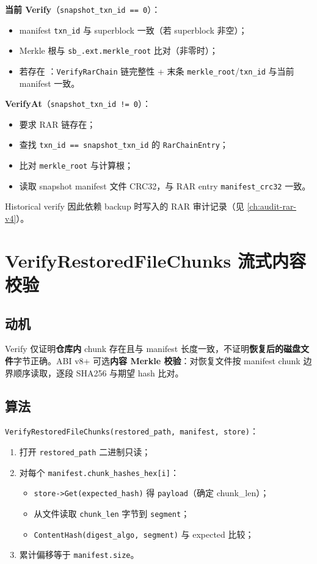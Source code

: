 \textbf{当前 Verify}（\texttt{snapshot\_txn\_id == 0}）：
\begin{itemize}[nosep]
  \item manifest \texttt{txn\_id} 与 superblock 一致（若 superblock 非空）；
  \item Merkle 根与 \texttt{sb\_.ext.merkle\_root} 比对（非零时）；
  \item 若存在 ：\texttt{VerifyRarChain} 链完整性 + 末条 \texttt{merkle\_root}/\texttt{txn\_id} 与当前 manifest 一致。
\end{itemize}

\textbf{VerifyAt}（\texttt{snapshot\_txn\_id != 0}）：
\begin{itemize}[nosep]
  \item 要求 RAR 链存在；
  \item 查找 \texttt{txn\_id == snapshot\_txn\_id} 的 \texttt{RarChainEntry}；
  \item 比对 \texttt{merkle\_root} 与计算根；
  \item 读取 snapshot manifest 文件 CRC32，与 RAR entry \texttt{manifest\_crc32} 一致。
\end{itemize}

Historical verify 因此依赖 backup 时写入的 RAR 审计记录（见 \cref{ch:audit-rar-v4}）。

\section{VerifyRestoredFileChunks 流式内容校验}

\subsection{动机}

Verify 仅证明\textbf{仓库内} chunk 存在且与 manifest 长度一致，不证明\textbf{恢复后的磁盘文件}字节正确。ABI v8+ 可选\textbf{内容 Merkle 校验}：对恢复文件按 manifest chunk 边界顺序读取，逐段 SHA256 与期望 hash 比对。

\subsection{算法}

\texttt{VerifyRestoredFileChunks(restored\_path, manifest, store)}：

\begin{enumerate}
  \item 打开 \texttt{restored\_path} 二进制只读；
  \item 对每个 \texttt{manifest.chunk\_hashes\_hex[i]}：
  \begin{itemize}[nosep]
    \item \texttt{store->Get(expected\_hash)} 得 \texttt{payload}（确定 chunk\_len）；
    \item 从文件读取 \texttt{chunk\_len} 字节到 \texttt{segment}；
    \item \texttt{ContentHash(digest\_algo, segment)} 与 expected 比较；
  \end{itemize}
  \item 累计偏移等于 \texttt{manifest.size}。
\end{enumerate}

